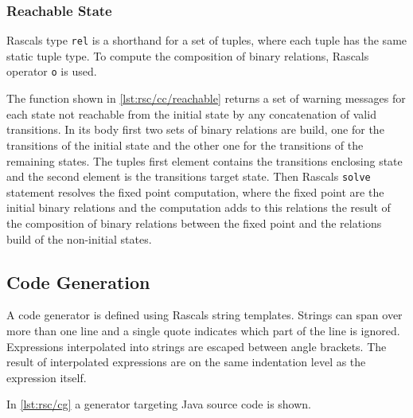 

\subsubsection{Reachable State}

Rascals type \lstinline[language=rascal]{rel} is a shorthand for a set of tuples, where each tuple has the same static tuple type.
To compute the composition of binary relations, Rascals operator \lstinline[language=rascal]{o} is used.

The function shown in \autoref{lst:rsc/cc/reachable} returns a set of warning messages for each state not reachable from the initial state by any concatenation of valid transitions.
In its body first two sets of binary relations are build, one for the transitions of the initial state and the other one for the transitions of the remaining states.
The tuples first element contains the transitions enclosing state and the second element is the transitions target state.
Then Rascals \lstinline[language=rascal]{solve} statement resolves the fixed point computation, where the fixed point are the initial binary relations and the computation adds to this relations the result of the composition of binary relations between the fixed point and the relations build of the non-initial states.



\subsection{Code Generation}
\label{ss:rsc/cg}

A code generator is defined using Rascals string templates.
Strings can span over more than one line and a single quote indicates which part of the line is ignored.
Expressions interpolated into strings are escaped between angle brackets.
The result of interpolated expressions are on the same indentation level as the expression itself.

In \autoref{lst:rsc/cg} a generator targeting Java source code is shown.




